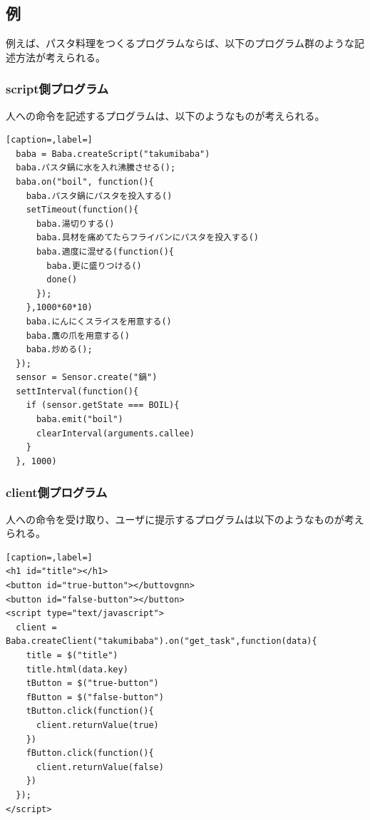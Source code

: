 \documentclass{deimj}
\begin{document}
\subsection{例}
例えば、パスタ料理をつくるプログラムならば、以下のプログラム群のような記述方法が考えられる。

\subsubsection{script側プログラム}
人への命令を記述するプログラムは、以下のようなものが考えられる。

\begin{lstlisting}[caption=,label=]
  baba = Baba.createScript("takumibaba")
  baba.パスタ鍋に水を入れ沸騰させる();
  baba.on("boil", function(){
    baba.パスタ鍋にパスタを投入する()
    setTimeout(function(){
      baba.湯切りする()
      baba.具材を痛めてたらフライパンにパスタを投入する()
      baba.適度に混ぜる(function(){
        baba.更に盛りつける()
        done()
      });
    },1000*60*10)
    baba.にんにくスライスを用意する()
    baba.鷹の爪を用意する()
    baba.炒める();
  });
  sensor = Sensor.create("鍋")
  settInterval(function(){
    if (sensor.getState === BOIL){
      baba.emit("boil")
      clearInterval(arguments.callee)
    }
  }, 1000)
\end{lstlisting}
  

\subsubsection{client側プログラム}
人への命令を受け取り、ユーザに提示するプログラムは以下のようなものが考えられる。
\begin{lstlisting}[caption=,label=]
<h1 id="title"></h1>
<button id="true-button"></buttovgnn>
<button id="false-button"></button>
<script type="text/javascript">
  client = Baba.createClient("takumibaba").on("get_task",function(data){
    title = $("title")
    title.html(data.key)
    tButton = $("true-button")
    fButton = $("false-button")
    tButton.click(function(){
      client.returnValue(true)
    })
    fButton.click(function(){
      client.returnValue(false)
    })
  });
</script>
\end{lstlisting}
    
  
\end{document}
